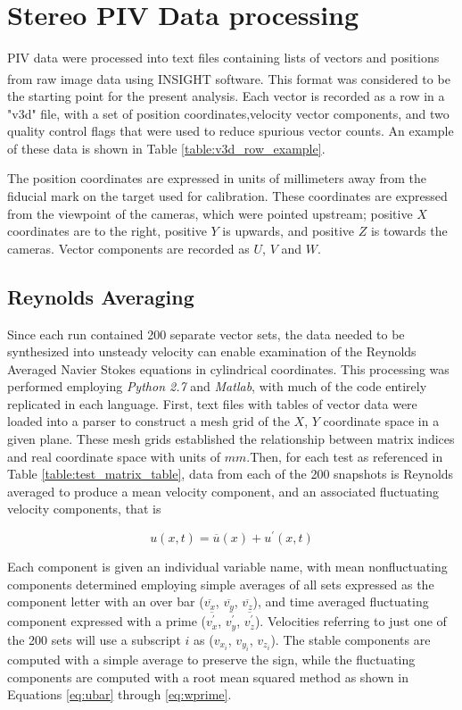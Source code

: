 \section{Stereo PIV Data processing}

PIV data were processed into text files containing lists of vectors and 
positions from raw image data using 
INSIGHT\textsuperscript{\textcopyright} software. 
This format was considered to be the 
starting point for the present analysis. Each vector is recorded as a row in a 
"v3d" file, with a set of position coordinates,velocity 
vector components, and two quality control flags that were used to reduce 
spurious vector counts. An example of these data is shown in Table 
\ref{table:v3d_row_example}.



The position coordinates are expressed in units of millimeters away from 
the fiducial mark on the target used for calibration. These coordinates are 
expressed from the viewpoint of the cameras, which were pointed upstream; 
positive $X$ coordinates are to the right, positive $Y$ is upwards, and 
positive $Z$ is towards the cameras. Vector components are recorded as $U$, 
$V$ and $W$. 

\subsection{Reynolds Averaging}
Since each run contained 200 separate vector sets, the data needed to be 
synthesized into unsteady velocity can enable examination of the Reynolds 
Averaged Navier Stokes equations in cylindrical coordinates. This processing 
was performed employing \textit{Python 2.7} and 
\textit{Matlab}, with much of the code entirely replicated in each language. 
First, text files with tables of vector data were loaded into a parser to 
construct a mesh grid of the $X$, $Y$ coordinate space in a given plane. These 
mesh grids established the relationship between matrix indices and real 
coordinate space with units of $mm$.Then, for each test as referenced in Table 
\ref{table:test_matrix_table}, data from 
each of the 200 snapshots is Reynolds averaged to produce a mean velocity 
component, and an associated fluctuating velocity components, that is

\begin{equation}
u(x,t) = \overline{u}(x) + u^\prime(x,t)
\label{eq:rans_components}
\end{equation}


Each component is given an individual variable name, with mean nonfluctuating 
components determined employing simple averages of all sets expressed as the 
component letter with an over bar ($\overline{v_x}$, $\overline{v_y}$, 
$\overline{v_z}$), and 
time averaged fluctuating component expressed with a prime 
($\overline{v_x^\prime}$, $\overline{v_y^\prime}$, $\overline{v_z^\prime}$). 
Velocities referring to just one of the 200 sets will use a 
subscript $i$ as ($v_{x_i}$, $v_{y_i}$, $v_{z_i}$). The stable components are 
computed with 
a simple average to preserve the sign, while the fluctuating components are 
computed with a root mean squared method as shown in Equations \ref{eq:ubar} 
through \ref{eq:wprime}.

